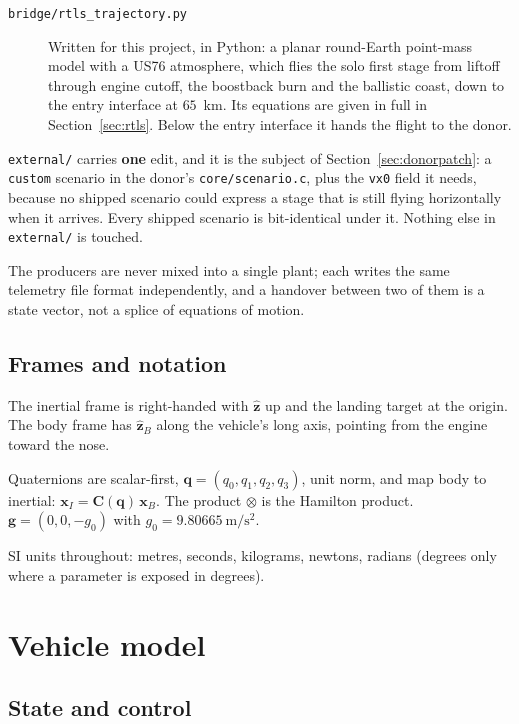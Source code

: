 \documentclass[11pt,a4paper]{article}
\newcommand{\vect}[1]{\mathbf{#1}}
\newcommand{\quat}[1]{\mathbf{#1}}
\newcommand{\Rot}{\vect{C}}
\newcommand{\code}[1]{\texttt{#1}}
\begin{document}
\begin{description}
\item[\code{bridge/rtls\_trajectory.py}] Written for this project, in Python: a
  planar round-Earth point-mass model with a US76 atmosphere, which flies the
  solo first stage from liftoff through engine cutoff, the boostback burn and
  the ballistic coast, down to the entry interface at $65$~km. Its equations are
  given in full in Section~\ref{sec:rtls}. Below the entry interface it hands
  the flight to the donor.
\end{description}

\code{external/} carries \textbf{one} edit, and it is the subject of
Section~\ref{sec:donorpatch}: a \code{custom} scenario in the donor's
\code{core/scenario.c}, plus the \code{vx0} field it needs, because no shipped
scenario could express a stage that is still flying horizontally when it arrives.
Every shipped scenario is bit-identical under it. Nothing else in
\code{external/} is touched.

The producers are never mixed into a single plant; each writes the same
telemetry file format independently, and a handover between two of them is a
state vector, not a splice of equations of motion.

\subsection{Frames and notation}

The inertial frame is right-handed with $\hat{\vect{z}}$ up and the landing
target at the origin. The body frame has $\hat{\vect{z}}_B$ along the vehicle's
long axis, pointing from the engine toward the nose.

Quaternions are scalar-first, $\quat{q}=(q_0,q_1,q_2,q_3)$, unit norm, and map
body to inertial: $\vect{x}_I=\Rot(\quat{q})\,\vect{x}_B$. The product
$\otimes$ is the Hamilton product. $\vect{g}=(0,0,-g_0)$ with
$g_0=9.80665\ \mathrm{m/s^2}$.

SI units throughout: metres, seconds, kilograms, newtons, radians (degrees only
where a parameter is exposed in degrees).

\section{Vehicle model}
\label{sec:vehicle}

\subsection{State and control}
\end{document}
